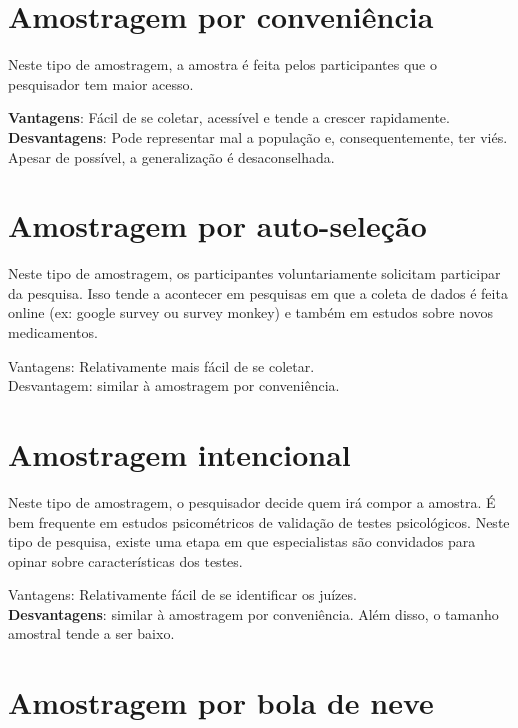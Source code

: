 \documentclass[
]{book}
\begin{document}
\hypertarget{amostragem-por-conveniuxeancia}{%
\section{Amostragem por
conveniência}\label{amostragem-por-conveniuxeancia}}

Neste tipo de amostragem, a amostra é feita pelos participantes que o
pesquisador tem maior acesso.

\textbf{Vantagens}: Fácil de se coletar, acessível e tende a crescer
rapidamente.\\
\textbf{Desvantagens}: Pode representar mal a população e,
consequentemente, ter viés. Apesar de possível, a generalização é
desaconselhada.

\hypertarget{amostragem-por-auto-seleuxe7uxe3o}{%
\section{Amostragem por
auto-seleção}\label{amostragem-por-auto-seleuxe7uxe3o}}

Neste tipo de amostragem, os participantes voluntariamente solicitam
participar da pesquisa. Isso tende a acontecer em pesquisas em que a
coleta de dados é feita online (ex: google survey ou survey monkey) e
também em estudos sobre novos medicamentos.

Vantagens: Relativamente mais fácil de se coletar.\\
Desvantagem: similar à amostragem por conveniência.

\hypertarget{amostragem-intencional}{%
\section{Amostragem intencional}\label{amostragem-intencional}}

Neste tipo de amostragem, o pesquisador decide quem irá compor a
amostra. É bem frequente em estudos psicométricos de validação de testes
psicológicos. Neste tipo de pesquisa, existe uma etapa em que
especialistas são convidados para opinar sobre características dos
testes.

Vantagens: Relativamente fácil de se identificar os juízes.\\
\textbf{Desvantagens}: similar à amostragem por conveniência. Além
disso, o tamanho amostral tende a ser baixo.

\hypertarget{amostragem-por-bola-de-neve}{%
\section{Amostragem por bola de
neve}\label{amostragem-por-bola-de-neve}}
\end{document}
